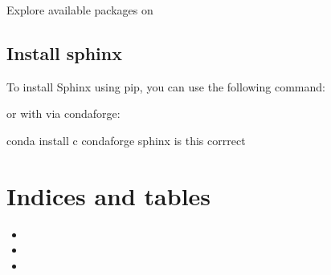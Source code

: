 \documentclass[letterpaper,10pt,english]{sphinxmanual}
\begin{document}
\sphinxAtStartPar
Explore available packages on 


\section{Install sphinx}
\label{\detokenize{Other/Sphinx_and_HTML_Web_Publishing:install-sphinx}}
\sphinxAtStartPar
To install Sphinx using pip, you can use the following command:

\sphinxAtStartPar
or with  via conda\sphinxhyphen{}forge:

\begin{sphinxVerbatim}[commandchars=\\\{\}]

\end{sphinxVerbatim}

\sphinxAtStartPar
conda install \sphinxhyphen{}c conda\sphinxhyphen{}forge sphinx is this corrrect


\chapter{Indices and tables}
\label{\detokenize{index:indices-and-tables}}\begin{itemize}
\item {} 
\sphinxAtStartPar
{}

\item {} 
\sphinxAtStartPar
{}

\item {} 
\sphinxAtStartPar
{}

\end{itemize}



\renewcommand{\indexname}{Index}
\printindex
\end{document}
